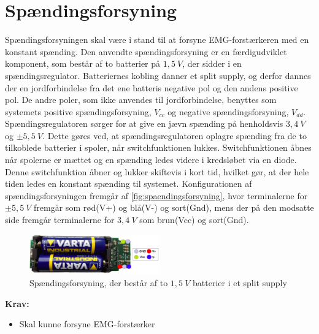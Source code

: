 \section{Spændingsforsyning} 
Spændingsforsyningen skal være i stand til at forsyne EMG-forstærkeren med en konstant spænding. Den anvendte spændingsforsyning er en færdigudviklet komponent, som består af to batterier på $1,5~V$, der sidder i en spændingsregulator. Batteriernes kobling danner et split supply, og derfor dannes der en jordforbindelse fra det ene batteris negative pol og den andens positive pol. De andre poler, som ikke anvendes til jordforbindelse, benyttes som systemets positive spændingsforsyning, ${V}_{cc}$ og negative spændingsforsyning, ${V}_{dd}$.
Spændingsregulatoren sørger for at give en jævn spænding på henholdsvis $3,4~V$ og $\pm 5,5~V$. Dette gøres ved, at spændingsregulatoren oplagre spænding fra de to tilkoblede batterier i spoler, når switchfunktionen lukkes. Switchfunktionen åbnes når spolerne er mættet og en spænding ledes videre i kredsløbet via en diode. Denne switchfunktion åbner og lukker skiftevis i kort tid, hvilket gør, at der hele tiden ledes en konstant spænding til systemet. 
Konfigurationen af spændingsforsyningen fremgår af \autoref{fig:spaendingsforsyning}, hvor terminalerne for $\pm 5,5~V$ fremgår som rød(V+) og blå(V-) og sort(Gnd), mens der på den modsatte side fremgår terminalerne for $3,4~V$ som brun(Vcc) og sort(Gnd). 

\begin{figure}[H]
\centering
\includegraphics[width=0.5\textwidth]{figures/spaendingsforsyning}
\caption{Spændingsforsyning, der består af to $1,5~V$ batterier i et split supply}
\label{fig:spaendingsforsyning}
\end{figure}

\textbf{Krav:}
\begin{itemize} 
\item Skal kunne forsyne EMG-forstærker
\end{itemize}
